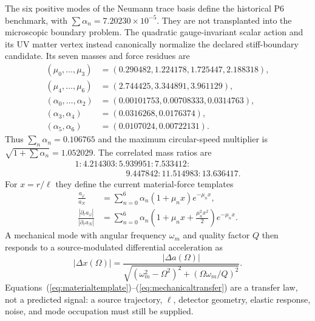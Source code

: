 \documentclass[10pt]{article}
\begin{document}
The six positive modes of the Neumann trace basis define the historical P6
benchmark, with $\sum\alpha_n=7.20230\times10^{-5}$.  They are not transplanted
into the microscopic boundary problem.  The quadratic gauge-invariant scalar
action and its UV matter vertex instead canonically normalize the declared
stiff-boundary candidate.  Its seven masses and force residues are
\begin{align}
 (\mu_0,\ldots,\mu_3)&=(0.290482,1.224178,1.725447,2.188318),\nonumber\\
 (\mu_4,\ldots,\mu_6)&=(2.744425,3.344891,3.961129),\\
 (\alpha_0,\ldots,\alpha_2)&=(0.00101753,0.00708333,0.0314763),\nonumber\\
 (\alpha_3,\alpha_4)&=(0.0316268,0.0176374),\nonumber\\
 (\alpha_5,\alpha_6)&=(0.0107024,0.00722131).
 \label{eq:stiffforce}
\end{align}
Thus $\sum_n\alpha_n=0.106765$ and the maximum circular-speed multiplier is
$\sqrt{1+\sum\alpha_n}=1.052029$.  The correlated mass ratios are
\begin{align}
 1:4.214303:5.939951:7.533412:\nonumber\\
 \hspace{6em}9.447842:11.514983:13.636417.
\end{align}
For $x=r/\ell$ they define the current material-force templates
\begin{align}
 \frac{a_\varphi}{a_N}&=\sum_{n=0}^{6}\alpha_n(1+\mu_nx)e^{-\mu_nx},\\
 \frac{|\partial_r a_\varphi|}{|\partial_r a_N|}
 &=\sum_{n=0}^{6}\alpha_n\left(1+\mu_nx+\frac{\mu_n^2x^2}{2}\right)e^{-\mu_nx}.
 \label{eq:materialtemplate}
\end{align}
A mechanical mode with angular frequency $\omega_m$ and quality factor $Q$
then responds to a source-modulated differential acceleration as
\begin{equation}
 |\Delta x(\Omega)|=\frac{|\Delta a(\Omega)|}
 {\sqrt{(\omega_m^2-\Omega^2)^2+(\Omega\omega_m/Q)^2}}.
 \label{eq:mechanicaltransfer}
\end{equation}
Equations~(\ref{eq:materialtemplate})--(\ref{eq:mechanicaltransfer}) are a
transfer law, not a predicted signal: a source trajectory, $\ell$, detector
geometry, elastic response, noise, and mode occupation must still be supplied.
\end{document}
